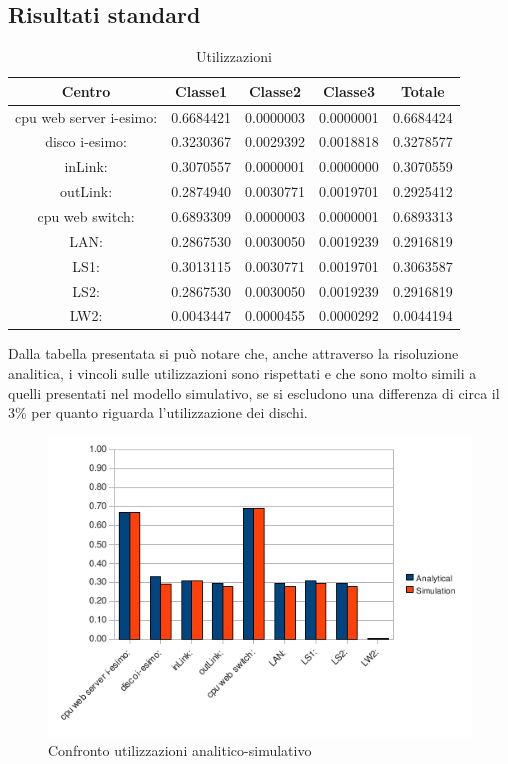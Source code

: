 \subsection{Risultati standard}
\begin{table}[H]
\begin{center}
\begin{tabular}{||c|c|c|c|c||}
\hline
Centro &Classe1 &Classe2 &Classe3 &Totale\\
\hline
\hline
 cpu web server i-esimo: 	&0.6684421	&0.0000003	&0.0000001	&0.6684424	\\\hline
 disco i-esimo: 	&0.3230367	&0.0029392	&0.0018818	&0.3278577	\\\hline
 inLink: 	&0.3070557	&0.0000001	&0.0000000	&0.3070559	\\\hline
 outLink: 	&0.2874940	&0.0030771	&0.0019701	&0.2925412	\\\hline
 cpu web switch: 	&0.6893309	&0.0000003	&0.0000001	&0.6893313	\\\hline
 LAN: 	&0.2867530	&0.0030050	&0.0019239	&0.2916819	\\\hline
 LS1: 	&0.3013115	&0.0030771	&0.0019701	&0.3063587	\\\hline
 LS2:	&0.2867530	&0.0030050	&0.0019239	&0.2916819	\\\hline
 LW2: 	&0.0043447	&0.0000455	&0.0000292	&0.0044194	\\\hline
\end{tabular}
\end{center}
\caption{Utilizzazioni}
\label{utilizzazioni}
\end{table}
Dalla tabella presentata si può notare che, anche attraverso la risoluzione analitica, i vincoli sulle utilizzazioni sono rispettati e che sono molto simili a quelli presentati nel modello simulativo, se si escludono una differenza di circa il 3\% per quanto riguarda l'utilizzazione dei dischi.
\begin{figure}[H]
\begin{center}
\includegraphics[scale=0.8]{etc/utilizzazione_standard.png}
\caption{Confronto utilizzazioni analitico-simulativo}
\label{confronto}
\end{center}
\end{figure}
